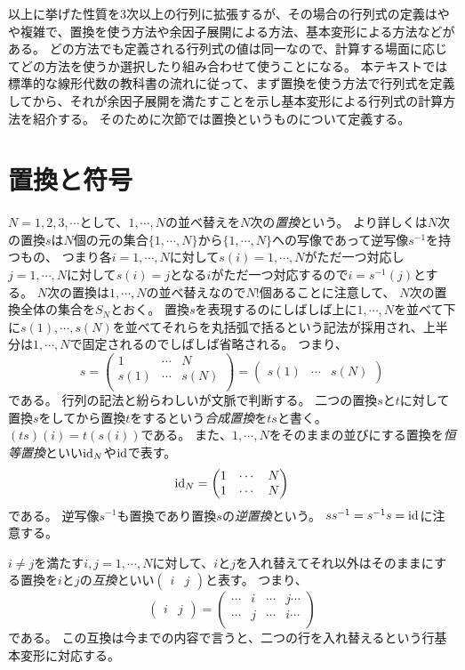 以上に挙げた性質を$3$次以上の行列に拡張するが、その場合の行列式の定義はやや複雑で、置換を使う方法や余因子展開による方法、基本変形による方法などがある。
どの方法でも定義される行列式の値は同一なので、計算する場面に応じてどの方法を使うか選択したり組み合わせて使うことになる。
本テキストでは標準的な線形代数の教科書の流れに従って、まず置換を使う方法で行列式を定義してから、それが余因子展開を満たすことを示し基本変形による行列式の計算方法を紹介する。
そのために次節では置換というものについて定義する。

\section{置換と符号}

$N = 1, 2, 3, \cdots$として、$1, \cdots, N$の並べ替えを$N$次の\emph{置換}という。
より詳しくは$N$次の置換$s$は$N$個の元の集合$\{ 1, \cdots, N \}$から$\{ 1, \cdots, N \}$への写像であって逆写像$s^{-1}$を持つもの、
つまり各$i = 1, \cdots, N$に対して$s(i) = 1, \cdots, N$がただ一つ対応し$j = 1, \cdots, N$に対して$s(i) = j$となる$i$がただ一つ対応するので$i = s^{-1}(j)$とする。
$N$次の置換は$1, \cdots, N$の並べ替えなので$N!$個あることに注意して、
$N$次の置換全体の集合を$S_N$とおく。
置換$s$を表現するのにしばしば上に$1, \cdots, N$を並べて下に$s(1), \cdots, s(N)$を並べてそれらを丸括弧で括るという記法が採用され、上半分は$1, \cdots, N$で固定されるのでしばしば省略される。
つまり、
$$
s =
\begin{pmatrix}
1 & \cdots & N \\
s(1) & \cdots & s(N) \\
\end{pmatrix}
=
\begin{pmatrix}s(1) & \cdots & s(N)\end{pmatrix}
$$
である。
行列の記法と紛らわしいが文脈で判断する。
二つの置換$s$と$t$に対して置換$s$をしてから置換$t$をするという\emph{合成置換}を$t s$と書く。
$(t s)(i) = t(s(i))$である。
また、$1, \cdots, N$をそのままの並びにする置換を\emph{恒等置換}といい$\mathrm{id}_N$や$\mathrm{id}$で表す。
$$
\mathrm{id}_N =
\begin{pmatrix}
1 & \cdots & N \\
1 & \cdots & N \\
\end{pmatrix}
$$
である。
逆写像$s^{-1}$も置換であり置換$s$の\emph{逆置換}という。
$s s^{-1} = s^{-1} s = \mathrm{id}$に注意する。

$i \ne j$を満たす$i, j = 1, \cdots, N$に対して、$i$と$j$を入れ替えてそれ以外はそのままにする置換を$i$と$j$の\emph{互換}といい$\begin{pmatrix}i & j\end{pmatrix}$と表す。
つまり、
$$
\begin{pmatrix}i & j\end{pmatrix} =
\begin{pmatrix}
\cdots & i & \cdots & j \cdots \\
\cdots & j & \cdots & i \cdots \\
\end{pmatrix}
$$
である。
この互換は今までの内容で言うと、二つの行を入れ替えるという行基本変形に対応する。

